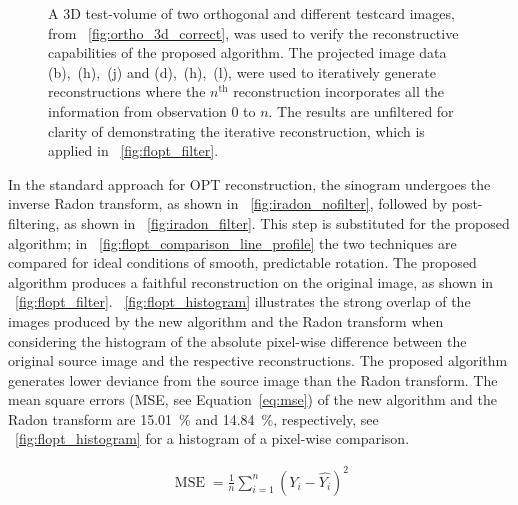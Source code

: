 \documentclass{osa-article}
\begin{document}
\begin{figure}
\begin{subfigure}[t]{0.2\linewidth}
    \end{subfigure}
    \caption[A 3D test-volume of two orthogonal and different testcard images, was used to verify the reconstructive capabilities of the proposed algorithm]{
    A 3D test-volume of two orthogonal and different testcard images, from \figurename~\ref{fig:ortho_3d_correct}, was used to verify the reconstructive capabilities of the proposed algorithm.
    The projected image data (b),~(h),~(j) and (d),~(h),~(l), were used to iteratively generate reconstructions where the \(n^\text{th}\) reconstruction incorporates all the information from observation 0 to \(n\).
    The results are unfiltered for clarity of demonstrating the iterative reconstruction, which is applied in \figurename~\ref{fig:flopt_filter}.
    }\label{fig:recon_iterative}
\end{figure}

In the standard approach for OPT reconstruction, the sinogram undergoes the inverse Radon transform, as shown in \figurename~\ref{fig:iradon_nofilter}, followed by post-filtering, as shown in \figurename~\ref{fig:iradon_filter}.
This step is substituted for the proposed algorithm; in \figurename~\ref{fig:flopt_comparison_line_profile} the two techniques are compared for ideal conditions of smooth, predictable rotation.
The proposed algorithm produces %
a faithful reconstruction on the original image, as shown in \figurename~\ref{fig:flopt_filter}. %
\figurename~\ref{fig:flopt_histogram} illustrates the strong overlap of the images produced by the new algorithm and the Radon transform when considering the histogram of the absolute pixel-wise difference between the original source image and the respective reconstructions.
The proposed algorithm generates lower deviance from the source image than the Radon transform.
The mean square errors (MSE, see Equation~\eqref{eq:mse}) of the new algorithm and the Radon transform are \SI{15.01}{\percent} and \SI{14.84}{\percent}, respectively, see \figurename~\ref{fig:flopt_histogram} for a histogram of a pixel-wise comparison.

\begin{align}
    \operatorname{MSE}=\frac{1}{n}\sum_{i=1}^n{(Y_i-\hat{Y_i})}^2 \label{eq:mse} %
\end{align}
\end{document}

